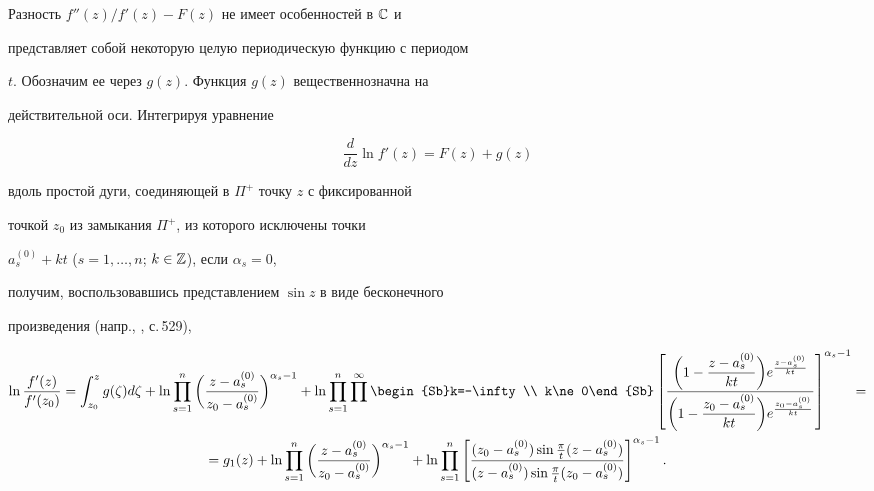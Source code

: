 Разность $f''(z)/f'(z)-F(z)$ не имеет особенностей в $\Bbb C$ и 


представляет собой некоторую целую периодическую функцию с периодом 


$t$. Обозначим ее через $g(z)$. Функция $g(z)$ вещественнозначна на 


действительной оси. Интегрируя уравнение 


$$ 


\frac{d}{d z}\ln f'(z)=F(z)+g(z) 


$$ 


вдоль простой дуги, соединяющей в $\Pi^+$ точку $z$ с фиксированной 


точкой $z_0$ из замыкания $\Pi^+$, из которого исключены точки 


$a^{(0)}_s+kt$ ($s=1,\dotsc,n$; $k\in\Bbb Z$), если $\alpha_s=0$, 


получим, воспользовавшись представлением $\sin z$ в виде бесконечного 


произведения (напр., \cite{2}, с.\,529), 


\begin{multline*} 


\ln\frac{f'(z)}{f'(z_0)}=\int^z_{z_0}g(\zeta)d\zeta+ 


\ln\prod^n_{s=1}\bigg(\frac{z-a^{(0)}_s}{z_0-a^{(0)}_s} 


\bigg)^{\alpha_s-1}+\ln\prod^n_{s=1} 


\prod^\infty\begin{Sb}k=-\infty\\ k\ne 0\end{Sb}\left[ 


\frac{\displaystyle\bigg(1-\frac{z-a^{(0)}_s}{kt}\bigg) 


\displaystyle e^{\frac{z-a^{(0)}_s}{kt}}} 


{\displaystyle\bigg(1-\frac{z_0-a^{(0)}_s}{kt}\bigg) 


\displaystyle e^{\frac{z_0-a^{(0)}_s}{kt}}}\right]^{\alpha_s-1}=\\ 


=g_1(z)+\ln\prod^n_{s=1}\bigg( 


\frac{z-a^{(0)}_s}{z_0-a^{(0)}_s}\bigg)^{\alpha_s-1} 


+\ln\prod^n_{s=1}\left[ 


\frac{(z_0-a^{(0)}_s)\sin\frac{\pi}{t}(z-a^{(0)}_s)} 


{(z-a^{(0)}_s)\sin\frac{\pi}{t}(z_0-a^{(0)}_s)} 


\right]^{\alpha_s-1}. 


\end{multline*} 


